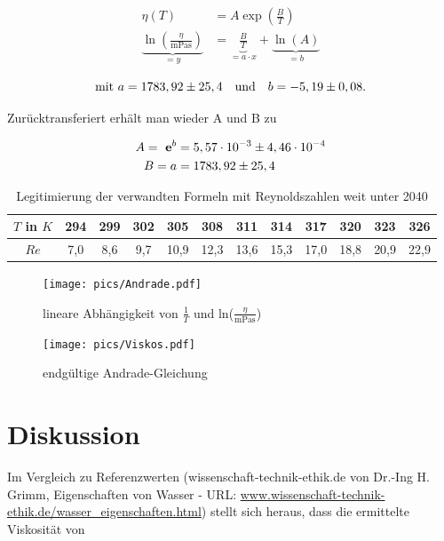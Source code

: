 \begin{align*}
 \eta(T) &= A \exp \left(\frac{B}{T}\right) \\
 \underbrace{\ln \left( \frac{\eta}{\text{mPas}} \right)}_{=y} &= \underbrace{\frac{B}{T}}_{=a\cdot x} +  \underbrace{\ln(A) }_{=b}
\end{align*}

\begin{equation}
\text{mit } a = 1783,92\pm 25,4 \quad \text{und} \quad b = -5,19 \pm 0,08.\\
\end{equation}

Zurücktransferiert erhält man wieder A und B zu

\begin{align}
 A = \ \mathbf{e}^b &= 5,57 \cdot 10^{-3} \pm 4,46 \cdot 10^{-4}\\
 B = a &= 1783,92 \pm 25,4
\end{align}

\begin{table}[H]
 \begin{tabular}{c|c|c|c|c|c|c|c|c|c|c|c}
  $T$ in $K$ & 294 & 299 & 302 & 305 & 308 & 311 & 314 & 317 & 320 & 323 & 326 \\
  \hline
  $Re$ & 7,0 &	8,6	&9,7	&10,9	&12,3	&13,6	&15,3	&17,0	&18,8	&20,9	&22,9
 \end{tabular}
\caption{Legitimierung der verwandten Formeln mit Reynoldszahlen weit unter 2040}
\end{table}


\begin{figure}[H]
\texttt{[image: pics/Andrade.pdf]}
\centering
\caption{lineare Abhängigkeit von $\frac1T$ und ln($\frac{\eta}{\text{mPas}}$)}
\end{figure}

\begin{figure}[H]
\texttt{[image: pics/Viskos.pdf]}
\centering
\caption{endgültige Andrade-Gleichung}
\end{figure}

\section{Diskussion}
Im Vergleich zu Referenzwerten ({wissenschaft-technik-ethik.de von Dr.-Ing H. Grimm, Eigenschaften von Wasser - URL: \href{http://www.wissenschaft-technik-ethik.de/wasser_eigenschaften.html#kap06}{www.wissenschaft-technik-ethik.de/wasser\_eigenschaften.html}})
stellt sich heraus, dass die ermittelte Viskosität von 

